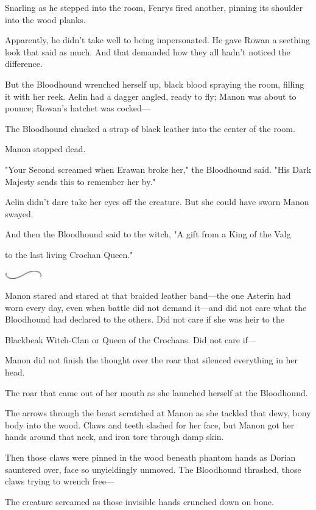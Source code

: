 Snarling as he stepped into the room, Fenrys fired another, pinning its shoulder into the wood planks.

Apparently, he didn't take well to being impersonated. He gave Rowan a seething look that said as much. And that demanded how they all hadn't noticed the difference.

But the Bloodhound wrenched herself up, black blood spraying the room, filling it with her reek. Aelin had a dagger angled, ready to fly; Manon was about to pounce; Rowan's hatchet was cocked---

The Bloodhound chucked a strap of black leather into the center of the room.

Manon stopped dead.

"Your Second screamed when Erawan broke her," the Bloodhound said. "His Dark Majesty sends this to remember her by."

Aelin didn't dare take her eyes off the creature. But she could have sworn Manon swayed.

And then the Bloodhound said to the witch, "A gift from a King of the Valg

 to the last living Crochan Queen."

\includegraphics[width=0.65in,height=0.13in]{images/seperator}

Manon stared and stared at that braided leather band---the one Asterin had worn every day, even when battle did not demand it---and did not care what the Bloodhound had declared to the others. Did not care if she was heir to the

Blackbeak Witch-Clan or Queen of the Crochans. Did not care if---

Manon did not finish the thought over the roar that silenced everything in her head.

The roar that came out of her mouth as she launched herself at the Bloodhound.

The arrows through the beast scratched at Manon as she tackled that dewy, bony body into the wood. Claws and teeth slashed for her face, but Manon got her hands around that neck, and iron tore through damp skin.

Then those claws were pinned in the wood beneath phantom hands as Dorian sauntered over, face so unyieldingly unmoved. The Bloodhound thrashed, those claws trying to wrench free---

The creature screamed as those invisible hands crunched down on bone.

